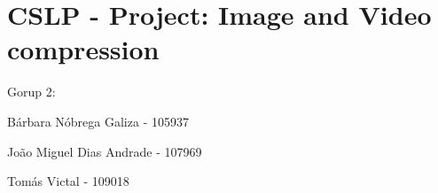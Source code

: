 \chapter{CSLP -\/ Project\+: Image and Video compression}
\hypertarget{md_README}{}\label{md_README}
\label{md_README_autotoc_md0}%
%
 Gorup 2\+:
\begin{DoxyItemize}
\item Bárbara Nóbrega Galiza -\/ 105937
\item João Miguel Dias Andrade -\/ 107969
\item Tomás Victal -\/ 109018 
\end{DoxyItemize}